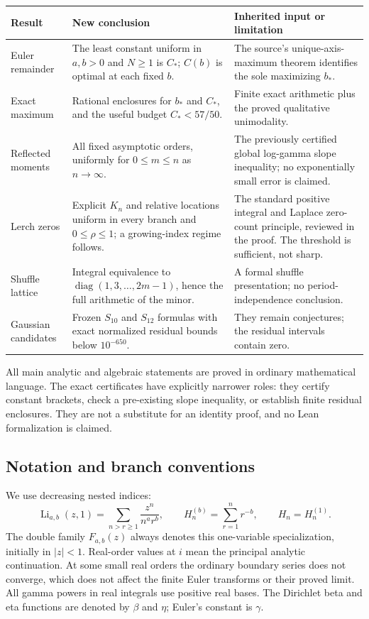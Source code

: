 \documentclass[11pt,letterpaper]{article}
\theoremstyle{definition}
\theoremstyle{remark}
\DeclareMathOperator{\Li}{Li}
\DeclareMathOperator{\diag}{diag}
\begin{document}
\begin{longtable}{@{}P{0.19\textwidth}P{0.46\textwidth}P{0.29\textwidth}@{}}
\toprule
Result & New conclusion & Inherited input or limitation\\
\midrule
\endhead
Euler remainder & The least constant uniform in $a,b>0$ and $N\ge1$ is
$C_*$; $C(b)$ is optimal at each fixed $b$. & The source's unique-axis-maximum
theorem identifies the sole maximizing $b_*$.\\
Exact maximum & Rational enclosures for $b_*$ and $C_*$, and the useful
budget $C_*<57/50$. & Finite exact arithmetic plus the proved qualitative
unimodality.\\
Reflected moments & All fixed asymptotic orders, uniformly for
$0\le m\le n$ as $n\to\infty$. & The previously certified global
log-gamma slope inequality; no exponentially small error is claimed.\\
Lerch zeros & Explicit $K_n$ and relative locations uniform in every
branch and $0\le\rho\le1$; a growing-index regime follows. & The
standard positive integral and Laplace zero-count principle, reviewed
in the proof. The threshold is sufficient, not sharp.\\
Shuffle lattice & Integral equivalence to
$\diag(1,3,\ldots,2m-1)$, hence the full arithmetic of the minor. & A
formal shuffle presentation; no period-independence conclusion.\\
Gaussian candidates & Frozen $S_{10}$ and $S_{12}$ formulas with exact
normalized residual bounds below $10^{-650}$. & They remain conjectures;
the residual intervals contain zero.\\
\bottomrule
\end{longtable}

All main analytic and algebraic statements are proved in ordinary
mathematical language. The exact certificates have explicitly narrower
roles: they certify constant brackets, check a pre-existing slope
inequality, or establish finite residual enclosures. They are not a
substitute for an identity proof, and no Lean formalization is claimed.

\subsection{Notation and branch conventions}

We use decreasing nested indices:
\[
 \Li_{a,b}(z,1)=\sum_{n>r\ge1}\frac{z^n}{n^a r^b},\qquad
 H_n^{(b)}=\sum_{r=1}^n r^{-b},\qquad H_n=H_n^{(1)}.
\]
The double family $F_{a,b}(z)$ always denotes this one-variable
specialization, initially in $|z|<1$. Real-order values at $i$ mean
the principal analytic continuation. At some small real orders the
ordinary boundary series does not converge, which does not affect the
finite Euler transforms or their proved limit. All gamma powers in real
integrals use positive real bases. The Dirichlet beta and eta functions
are denoted by $\beta$ and $\eta$; Euler's constant is $\gamma$.
\end{document}
